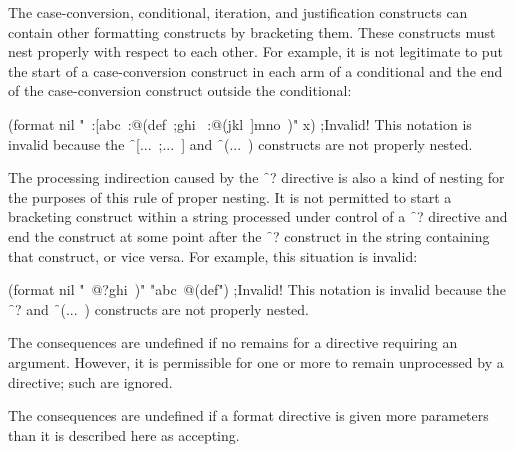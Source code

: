 

The case-conversion, conditional, iteration, and justification
constructs can contain other formatting constructs by bracketing them.
These constructs must nest properly with respect to each other.
For example, it is not legitimate to put the start of a case-conversion
construct in each arm of a conditional and the
end of the case-conversion construct outside the conditional:

\code
 (format nil "~:[abc~:@(def~;ghi~
:@(jkl~]mno~)" x) ;Invalid!
\endcode
This notation is invalid because the \f{~[...~;...~]}
and \f{~(...~)} constructs are not properly nested.
                                   
The processing indirection caused by the \f{~?} directive
is also a kind of nesting for the purposes of this rule of proper nesting.
It is not permitted to
start a bracketing construct within a string processed
under control of a \f{~?}                                      
directive and end the construct at some point after the \f{~?} construct
in the string containing that construct, or vice versa.
For example, this situation is invalid:
                                                                               
\code
 (format nil "~@?ghi~)" "abc~@(def") ;Invalid!
\endcode
This notation
is invalid because the \f{~?}
and \f{~(...~)} constructs are not properly nested.

\endsubsubsection%


The consequences are undefined if no  remains for a directive 
requiring an argument.  However, it is permissible for one or more  
to remain unprocessed by a directive; such  are ignored.
 
\endsubsubsection%


The consequences are undefined if a format directive is given more parameters 
than it is described here as accepting.

\endsubsubsection%

